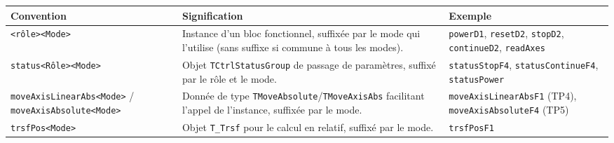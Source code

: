 \begin{center}
    \begin{tabular}{|p{4.4cm}|p{6cm}|p{3.8cm}|}
        \hline
        \textbf{Convention} & \textbf{Signification} & \textbf{Exemple} \\
        \hline
        \texttt{<rôle><Mode>} & Instance d'un bloc fonctionnel, suffixée par le mode qui l'utilise (sans suffixe si commune à tous les modes). & \texttt{powerD1}, \texttt{resetD2}, \texttt{stopD2}, \texttt{continueD2}, \texttt{readAxes} \\
        \hline
        \texttt{status<Rôle><Mode>} & Objet \texttt{TCtrlStatusGroup} de passage de paramètres, suffixé par le rôle et le mode. & \texttt{statusStopF4}, \texttt{statusContinueF4}, \texttt{statusPower} \\
        \hline
        \texttt{moveAxisLinearAbs<Mode>} / \texttt{moveAxisAbsolute<Mode>} & Donnée de type \texttt{TMoveAbsolute}/\texttt{TMoveAxisAbs} facilitant l'appel de l'instance, suffixée par le mode. & \texttt{moveAxisLinearAbsF1} (TP4), \texttt{moveAxisAbsoluteF4} (TP5) \\
        \hline
        \texttt{trsfPos<Mode>} & Objet \texttt{T\_Trsf} pour le calcul en relatif, suffixé par le mode. & \texttt{trsfPosF1} \\
        \hline
    \end{tabular}
\end{center}
